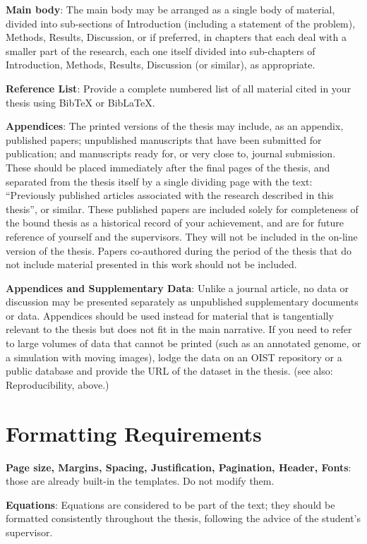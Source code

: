 \textbf{Main body}:  The main body may be arranged as a single body of material, divided into sub-sections of Introduction (including a statement of the problem), Methods, Results, Discussion, or if preferred, in chapters that each deal with a smaller part of the research, each one itself divided into sub-chapters of Introduction, Methods, Results, Discussion (or similar), as appropriate. 

\textbf{Reference List}:  Provide a complete numbered list of all material cited in your thesis using BibTeX or BibLaTeX.

\textbf{Appendices}: The printed versions of the thesis may include, as an appendix, published papers; unpublished manuscripts that have been submitted for publication; and manuscripts ready for, or very close to, journal submission.  These should be placed immediately after the final pages of the thesis, and separated from the thesis itself by a single dividing page with the text: ``Previously published articles associated with the research described in this thesis'', or similar. These published papers are included solely for completeness of the bound thesis as a historical record of your achievement, and are for future reference of yourself and the supervisors.  They will not be included in the on-line version of the thesis. Papers co-authored during the period of the thesis that do not include material presented in this work should not be included.

\textbf{Appendices and Supplementary Data}: Unlike a journal article, no data or discussion may be presented separately as unpublished supplementary documents or data.  Appendices should be used instead for material that is tangentially relevant to the thesis but does not fit in the main narrative. If you need to refer to large volumes of data that cannot be printed (such as an annotated genome, or a simulation with moving images), lodge the data on an OIST repository or a public database and provide the URL of the dataset in the thesis.  (see also: Reproducibility, above.)


\section{Formatting Requirements}

\textbf{Page size, Margins, Spacing, Justification, Pagination, Header, Fonts}: those are already built-in the templates. Do not modify them.

\textbf{Equations}: Equations are considered to be part of the text; they should be formatted consistently throughout the thesis, following the advice of the student's supervisor.  

